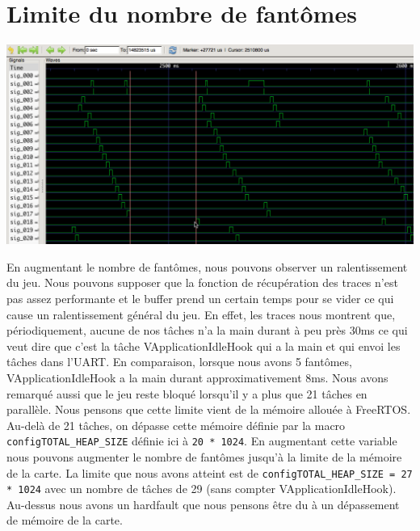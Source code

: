 \documentclass[a4paper]{article}
\begin{document}
\section{Limite du nombre de fantômes}
\begin{center}
\includegraphics[scale=0.455]{images/traces18.png}
\end{center}
En augmentant le nombre de fantômes, nous pouvons observer un ralentissement du jeu.
Nous pouvons supposer que la fonction de récupération des traces n'est pas assez
performante et le buffer prend un certain temps pour se vider ce qui cause un ralentissement
général du jeu. En effet, les traces nous montrent que, périodiquement, aucune de nos tâches n'a la main
durant à peu près 30ms ce qui veut dire que c'est la tâche VApplicationIdleHook qui a la main
et qui envoi les tâches dans l'UART. En comparaison, lorsque nous avons 5 fantômes,
VApplicationIdleHook a la main durant approximativement 8ms.
\newline
Nous avons remarqué aussi que le jeu reste bloqué lorsqu'il y a plus que 21 tâches
en parallèle. Nous pensons que cette limite vient de la mémoire allouée à FreeRTOS.
Au-delà de 21 tâches, on dépasse cette mémoire définie par la macro \texttt{configTOTAL_HEAP_SIZE}
définie ici à \texttt{20 * 1024}. En augmentant cette variable nous pouvons augmenter le
nombre de fantômes jusqu'à la limite de la mémoire de la carte. La limite que nous
avons atteint est de \texttt{configTOTAL_HEAP_SIZE = 27 * 1024} avec un nombre de tâches
de 29 (sans compter VApplicationIdleHook). Au-dessus nous avons un hardfault que
nous pensons être du à un dépassement de mémoire de la carte.
\end{document}
